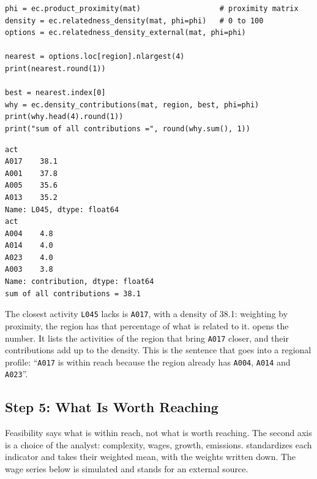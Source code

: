 \begin{lstlisting}
phi = ec.product_proximity(mat)                  # proximity matrix
density = ec.relatedness_density(mat, phi=phi)   # 0 to 100
options = ec.relatedness_density_external(mat, phi=phi)

nearest = options.loc[region].nlargest(4)
print(nearest.round(1))

best = nearest.index[0]
why = ec.density_contributions(mat, region, best, phi=phi)
print(why.head(4).round(1))
print("sum of all contributions =", round(why.sum(), 1))
\end{lstlisting}
\begin{lstlisting}[language={}, numbers=none, backgroundcolor=\color{white}, frame=leftline, framerule=2pt, rulecolor=\color{noteborder}, xleftmargin=1.5em]
act
A017    38.1
A001    37.8
A005    35.6
A013    35.2
Name: L045, dtype: float64
act
A004    4.8
A014    4.0
A023    4.0
A003    3.8
Name: contribution, dtype: float64
sum of all contributions = 38.1
\end{lstlisting}

The closest activity \texttt{L045} lacks is \texttt{A017}, with
a density of 38.1: weighting by proximity, the region
has that percentage of what is related to it. 
opens the number. It lists the activities of the region that bring
\texttt{A017} closer, and their contributions add up to the density.
This is the sentence that goes into a regional profile:
``\texttt{A017} is within reach because the region already has
\texttt{A004}, \texttt{A014} and
\texttt{A023}''.

\subsection{Step 5: What Is Worth Reaching}

Feasibility says what is within reach, not what is worth
reaching. The second axis is a choice of the analyst: complexity, wages,
growth, emissions.  standardizes each indicator
and takes their weighted mean, with the weights written down. The wage
series below is simulated and stands for an external source.

